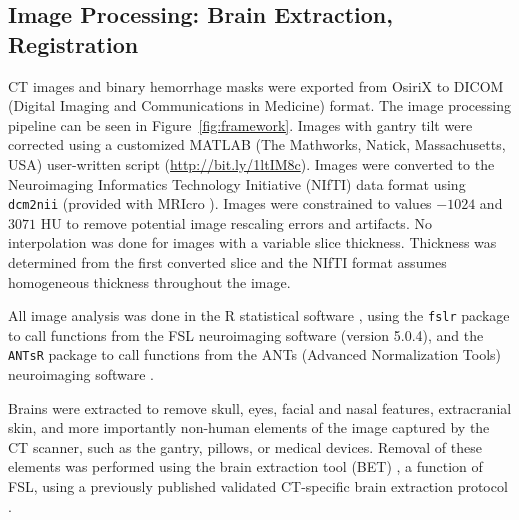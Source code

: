 \documentclass{elsarticle_nonatbib}\usepackage[]{graphicx}\usepackage[]{color}
\newcommand{\pkg}[1]{\texttt{#1}}
\begin{document}
\subsection{Image Processing: Brain Extraction, Registration}
CT images and binary hemorrhage masks were exported from OsiriX to DICOM (Digital Imaging and Communications in Medicine) format.   The image processing pipeline can be seen in Figure~\ref{fig:framework}.   Images with gantry tilt were corrected using a customized MATLAB (The Mathworks, Natick, Massachusetts, USA) user-written script ({\scriptsize \url{http://bit.ly/1ltIM8c}}). Images were converted to the Neuroimaging Informatics Technology Initiative (NIfTI) data format using \verb|dcm2nii| (provided with MRIcro \citep{rorden_stereotaxic_2000}).  Images were constrained to values $-1024$ and $3071$ HU to remove potential image rescaling errors and artifacts.   No interpolation was done for images with a variable slice thickness. Thickness was determined from the first converted slice and the NIfTI format assumes homogeneous thickness throughout the image.  

All image analysis was done in the R statistical software \citep{RCORE}, using the \pkg{fslr} \citep{muschelli2015fslr} package to call functions from the FSL \citep{jenkinson_fsl_2012} neuroimaging software (version 5.0.4), and the \pkg{ANTsR} package to call functions from the ANTs (Advanced Normalization Tools) neuroimaging software \citep{avants_reproducible_2011}.

Brains were extracted to remove skull, eyes, facial and nasal features, extracranial skin, and more importantly non-human elements of the image captured by the CT scanner, such as the gantry, pillows, or medical devices.  Removal of these elements was performed using the brain extraction tool (BET) \citep{smith_fast_2002}, a function of FSL, using a previously published validated CT-specific brain extraction protocol \citep{muschelli_validated_2015}.  
\end{document}
